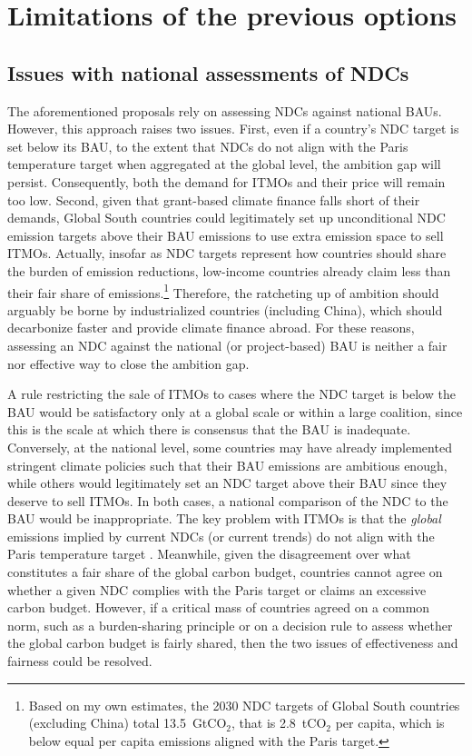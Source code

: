 ﻿\documentclass[12pt,english]{article}
\begin{document}
\section{Limitations of the previous options\label{subsec:limitations}}

\subsection{Issues with national assessments of NDCs}
The aforementioned proposals %
rely on assessing NDCs against national BAUs. However, this approach raises two issues. 
First, even if a country's NDC target is set below its BAU, to the extent that NDCs do not align with the Paris temperature target when aggregated at the global level, the ambition gap will persist. %
Consequently, both the demand for ITMOs and their price will remain too low. Second, given that %
grant-based climate finance falls short of their demands, Global South countries could legitimately set up unconditional NDC emission targets above their BAU emissions to use extra emission space to sell ITMOs. Actually, insofar as NDC targets represent how countries should share the burden of emission reductions, low-income countries already claim less than their fair share of emissions.\footnote{Based on my own estimates, the 2030 NDC targets of Global South countries (excluding China) total 13.5~GtCO$_\text{2}$, that is 2.8~tCO$_\text{2}$ per capita, which is below equal per capita emissions aligned with the Paris target.} %
Therefore, the ratcheting up of ambition should arguably be borne by industrialized countries (including China), which should decarbonize faster and provide climate finance abroad. For these reasons, assessing an NDC against the national (or project-based) BAU is neither a fair nor effective way to close the ambition gap. %

A rule restricting the sale of ITMOs to cases where the NDC target is below the BAU would be satisfactory only at a global scale or within a large coalition, since this is the scale at which there is consensus that the BAU is inadequate.
Conversely, at the national level, some countries may have already implemented stringent climate policies %
such that their BAU emissions are ambitious enough, while others would legitimately set an NDC target above their BAU since they deserve to sell ITMOs. In both cases, a national comparison of the NDC to the BAU would be inappropriate. 
The key problem with ITMOs is that the \textit{global} emissions implied by current NDCs (or current trends) do not align with the Paris temperature target \citep{unep_emissions_2025,rogelj_credibility_2023}. 
Meanwhile, given the disagreement over what constitutes a fair share of the global carbon budget, countries cannot agree on whether a given NDC complies with the Paris target or %
claims an excessive carbon budget. However, if a critical mass of countries agreed on a common norm, such as a burden-sharing principle or on a decision rule to assess whether the global carbon budget is fairly shared, then the two issues of effectiveness %
and fairness could be resolved. 
\end{document}
